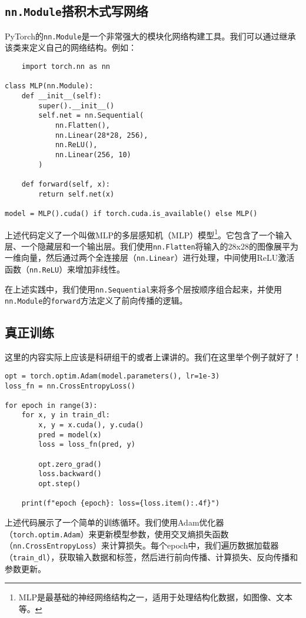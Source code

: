 \documentclass[../main.tex]{subfiles}
\begin{document}
\subsection{\texttt{nn.Module}搭积木式写网络}

PyTorch的\texttt{nn.Module}是一个非常强大的模块化网络构建工具。我们可以通过继承该类来定义自己的网络结构。例如：

\begin{lstlisting}
    import torch.nn as nn

class MLP(nn.Module):
    def __init__(self):
        super().__init__()
        self.net = nn.Sequential(
            nn.Flatten(),
            nn.Linear(28*28, 256),
            nn.ReLU(),
            nn.Linear(256, 10)
        )

    def forward(self, x):
        return self.net(x)

model = MLP().cuda() if torch.cuda.is_available() else MLP()
\end{lstlisting}

上述代码定义了一个叫做MLP的多层感知机（MLP）模型\footnote{MLP是最基础的神经网络结构之一，适用于处理结构化数据，如图像、文本等。}。它包含了一个输入层、一个隐藏层和一个输出层。我们使用\texttt{nn.Flatten}将输入的28x28的图像展平为一维向量，然后通过两个全连接层（\texttt{nn.Linear}）进行处理，中间使用ReLU激活函数（\texttt{nn.ReLU}）来增加非线性。

在上述实践中，我们使用\texttt{nn.Sequential}来将多个层按顺序组合起来，并使用\texttt{nn.Module}的\texttt{forward}方法定义了前向传播的逻辑。

\subsection{真正训练}

这里的内容实际上应该是科研组干的或者上课讲的。我们在这里举个例子就好了！

\begin{lstlisting}
opt = torch.optim.Adam(model.parameters(), lr=1e-3)
loss_fn = nn.CrossEntropyLoss()

for epoch in range(3):
    for x, y in train_dl:
        x, y = x.cuda(), y.cuda()
        pred = model(x)
        loss = loss_fn(pred, y)

        opt.zero_grad()
        loss.backward()
        opt.step()

    print(f"epoch {epoch}: loss={loss.item():.4f}")
\end{lstlisting}

上述代码展示了一个简单的训练循环。我们使用Adam优化器（\texttt{torch.optim.Adam}）来更新模型参数，使用交叉熵损失函数（\texttt{nn.CrossEntropyLoss}）来计算损失。每个epoch中，我们遍历数据加载器（\texttt{train\_dl}），获取输入数据和标签，然后进行前向传播、计算损失、反向传播和参数更新。
\end{document}

